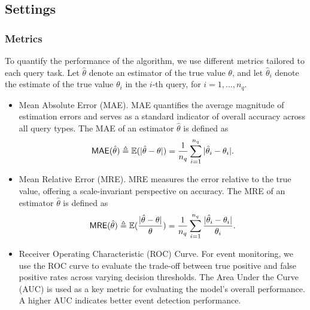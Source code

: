 \subsection{Settings}

\subsubsection{Metrics}

To quantify the performance of the algorithm, we use different metrics tailored
to each query task.
Let $\hat\theta$ denote an estimator of the true value $\theta$, and let
$\hat\theta_i$ denote the estimate of the true value $\theta_i$ in the $i$-th query,
for $i=1,\ldots,n_q$.
\begin{itemize}
    \item {Mean Absolute Error (MAE)}.
MAE quantifies the average magnitude of estimation errors and serves as a
standard indicator of overall accuracy across all query types.
The MAE of an estimator $\hat\theta$ is defined as
\[
  \mathsf{MAE}(\hat\theta)
  \triangleq \mathbb{E}(|\hat\theta - \theta |)
  = \frac{1}{n_q}\sum_{i=1}^{n_q} |\hat\theta_i - \theta_i |.
\]
    \item {Mean Relative Error (MRE)}.
MRE measures the error relative to the true value, offering
a scale-invariant perspective on accuracy.
The MRE of an estimator $\hat\theta$ is defined as
\[
  \mathsf{MRE}(\hat\theta)
  \triangleq \mathbb{E}(\frac{|\hat\theta - \theta |}{\theta})
  = \frac{1}{n_q}\sum_{i=1}^{n_q}\frac{|\hat\theta_i - \theta_i|}{\theta_i}.
\]
    \item {Receiver Operating Characteristic (ROC) Curve}.
For event monitoring, we use the ROC curve to evaluate the trade-off between
true positive and false positive rates across varying decision thresholds.
The Area Under the Curve (AUC) is used as a key metric for evaluating the
model's overall performance.
A higher AUC indicates better event detection performance.
\end{itemize}


